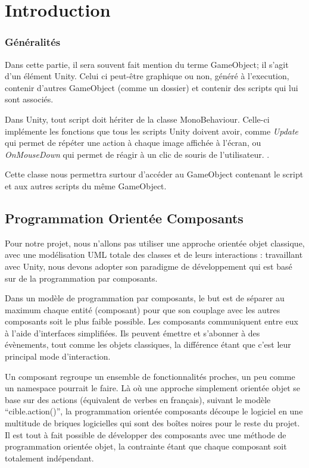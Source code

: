 \section{Introduction}

\subsubsection{Généralités}
Dans cette partie, il sera souvent fait mention du terme GameObject; il s'agit d'un élément Unity. 
Celui ci peut-être graphique ou non, généré à l'execution, contenir d'autres GameObject (comme un dossier) et contenir des scripts qui lui sont associés.\newline

Dans Unity, tout script doit hériter de la classe MonoBehaviour. Celle-ci implémente les fonctions que tous les scripts Unity doivent avoir, comme \textit{Update} qui permet de répéter une action à chaque image affichée à l'écran, ou \textit{OnMouseDown} qui permet de réagir à un clic de souris de l'utilisateur. .\newline

Cette classe nous permettra surtour d'accéder au GameObject contenant le script et aux autres scripts du même GameObject.

\subsection{Programmation Orientée Composants}

Pour notre projet, nous n'allons pas utiliser une approche orientée objet classique, avec une modélisation UML totale des classes et de leurs interactions : travaillant avec Unity, nous devons adopter son paradigme de développement qui est basé sur de la programmation par composants.\newline

Dans un modèle de programmation par composants, le but est de séparer au maximum chaque entité (composant) pour que son couplage avec les autres composants soit le plus faible possible. Les composants communiquent entre eux à l'aide d'interfaces simplifiées. Ils peuvent émettre et s'abonner à des évènements, tout comme les objets classiques, la différence étant que c'est leur principal mode d'interaction.\newline

Un composant regroupe un ensemble de fonctionnalités proches, un peu comme un namespace pourrait le faire. Là où une approche simplement orientée objet se base sur des actions (équivalent de verbes en français), suivant le modèle \enquote{cible.action()}, la programmation orientée composants découpe le logiciel en une multitude de briques logicielles qui sont des boîtes noires pour le reste du projet. Il est tout à fait possible de développer des composants avec une méthode de programmation orientée objet, la contrainte étant que chaque composant soit totalement indépendant.\newline

